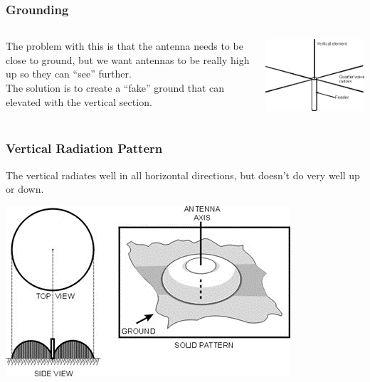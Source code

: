 \documentclass[10pt, handout]{beamer}
\begin{document}
\begin{frame}
\frametitle{Grounding}
\begin{columns}
\begin{column}{.5\textwidth}
The problem with this is that the antenna needs to be close to ground, but we want antennas to be really high up so they can ``see'' further.\\
The solution is to create a ``fake'' ground that can elevated with the vertical section.
\end{column}
\begin{column}{.5\textwidth}
\includegraphics[width=\textwidth]{qwavevertwground.png}
\end{column}
\end{columns}
\end{frame}

\begin{frame}
\frametitle{Vertical Radiation Pattern}
The vertical radiates well in all horizontal directions, but doesn't do very well up or down.
\begin{center}
\includegraphics[height=.7\textheight]{qwavevertrad.png}
\end{center}
\end{frame}
\end{document}
